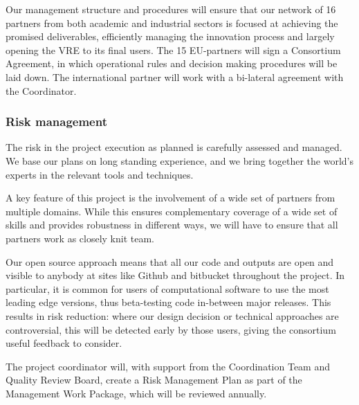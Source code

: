 Our management structure and procedures will ensure that our network
of 16 partners from both academic and industrial sectors is focused at
achieving the promised deliverables, efficiently managing the
innovation process and largely opening the VRE to its final users. The
15 EU-partners will sign a Consortium Agreement, in which operational
rules and decision making procedures will be laid down. The
international partner will work with a bi-lateral agreement with the
Coordinator.







\subsubsection{Risk management}\label{sec:risks}

The risk in the project execution as planned is carefully assessed and
managed. We base our plans on long standing experience, and we bring
together the world's experts in the relevant tools and techniques.

A key feature of this project is the involvement of a wide set of
partners from multiple domains. While this ensures complementary
coverage of a wide set of skills and provides robustness in different
ways, we will have to ensure that all partners work as closely knit
team. 

Our open source approach means that all our code and outputs
are open and visible to anybody at sites like Github and bitbucket
throughout the project. In particular, it is common for users of
computational software to use the most leading edge versions, thus
beta-testing code in-between major releases. This results in risk
reduction: where our design decision or technical approaches are
controversial, this will be detected early by those users, giving the
consortium useful feedback to consider.

The project coordinator will, with support from the Coordination Team
and Quality Review Board, create a Risk Management Plan
 as part of the Management Work Package,
which will be reviewed annually.


